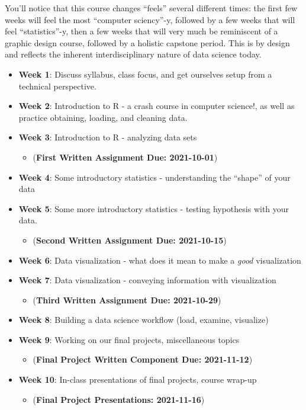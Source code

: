 \documentclass[
]{book}
\providecommand{\tightlist}{%
  \setlength{\itemsep}{0pt}\setlength{\parskip}{0pt}}
\begin{document}
You'll notice that this course changes ``feels'' several different times: the first few weeks will feel the most ``computer sciency''-y, followed by a few weeks that will feel ``statistics''-y, then a few weeks that will very much be reminiscent of a graphic design course, followed by a holistic capstone period. This is by design and reflects the inherent interdisciplinary nature of data science today.

\begin{itemize}
\tightlist
\item
  \textbf{Week 1}: Discuss syllabus, class focus, and get ourselves setup from a technical perspective.
\item
  \textbf{Week 2}: Introduction to R - a crash course in computer science!, as well as practice obtaining, loading, and cleaning data.
\item
  \textbf{Week 3}: Introduction to R - analyzing data sets

  \begin{itemize}
  \tightlist
  \item
    (\textbf{First Written Assignment Due: 2021-10-01})
  \end{itemize}
\item
  \textbf{Week 4}: Some introductory statistics - understanding the ``shape'' of your data
\item
  \textbf{Week 5}: Some more introductory statistics - testing hypothesis with your data.

  \begin{itemize}
  \tightlist
  \item
    (\textbf{Second Written Assignment Due: 2021-10-15})
  \end{itemize}
\item
  \textbf{Week 6}: Data visualization - what does it mean to make a \emph{good} visualization
\item
  \textbf{Week 7}: Data visualization - conveying information with visualization

  \begin{itemize}
  \tightlist
  \item
    (\textbf{Third Written Assignment Due: 2021-10-29})
  \end{itemize}
\item
  \textbf{Week 8}: Building a data science workflow (load, examine, visualize)
\item
  \textbf{Week 9}: Working on our final projects, miscellaneous topics

  \begin{itemize}
  \tightlist
  \item
    (\textbf{Final Project Written Component Due: 2021-11-12})
  \end{itemize}
\item
  \textbf{Week 10}: In-class presentations of final projects, course wrap-up

  \begin{itemize}
  \tightlist
  \item
    (\textbf{Final Project Presentations: 2021-11-16})
  \end{itemize}
\end{itemize}
\end{document}
